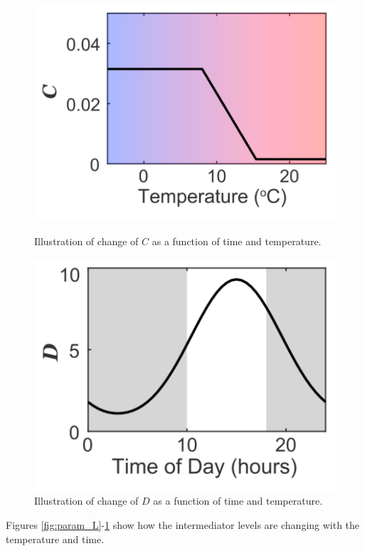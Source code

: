 \documentclass[11pt, a4paper]{article}
\begin{document}
\begin{figure}[H]
    \centering
    \begin{minipage}{0.4\textwidth}
        \centering
        \includegraphics[width=1.0\textwidth]{./images/param_C.png}
        \caption{Illustration of change of $C$ as a function of time and temperature.}
        \label{fig:param_C}
    \end{minipage}
    \hfill
    \begin{minipage}{0.4\textwidth}
        \centering
        \includegraphics[width=1.0\textwidth]{./images/param_D.png}
        \caption{Illustration of change of $D$ as a function of time and temperature.}
        \label{fig:param_D}
    \end{minipage}
\end{figure}
Figures \ref{fig:param_L}-\ref{fig:param_D} show how the intermediator levels are changing with the temperature and time.
\end{document}
